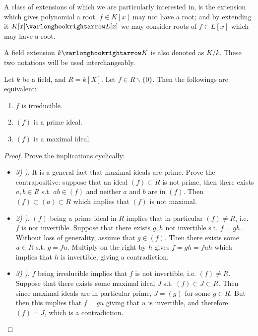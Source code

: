 \documentclass{article}
\begin{document}
\textstart
A class of extensions of which we are particularly interested in, is the extension which gives polynomial a root. $f \in K[x]$ may not have a root; and by extending it $K[x] \ext L[x]$ we may consider roots of $f \in L[x]$ which may have a root.

\begin{notation}
    A field extension $k \ext K$ is also denoted as $K/k$. These two notations will be used interchangeably.
\end{notation}

\begin{proposition}
    Let $k$ be a field, and $R = k[X]$. Let $f \in R \smallsetminus \{0\}$. Then the followings are equivalent:
    \begin{enumerate}[label=\arabic*)]
        \item $f$ is irreducible.
        \item $(f)$ is a prime ideal.
        \item $(f)$ is a maximal ideal.
    \end{enumerate}
\end{proposition}

\begin{proof}
    Prove the implications cyclically:
    \begin{itemize}
        \item \emph{3) ).} It is a general fact that maximal ideals are prime. Prove the contrapositive: suppose that an ideal $(f) \subset R$ is not prime, then there exists $a, b \in R$ s.t. $ab \in (f)$ and neither $a$ and $b$ are in $(f)$. Then $(f) \subset (a) \subset R$ which implies that $(f)$ is not maximal.
        \item \emph{2) ).} $(f)$ being a prime ideal in $R$ implies that in particular $(f) \neq R$, i.e. $f$ is not invertible. Suppose that there exists $g, h$ not invertible s.t. $f = gh$. Without loss of generality, assume that $g \in (f)$. Then there exists some $u \in R$ s.t. $g = fu$. Multiply on the right by $h$ gives $f = gh = fuh$ which implies that $h$ is invertible, giving a contradiction.
        \item \emph{3) ).} $f$ being irreducible implies that $f$ is not invertible, i.e. $(f) \neq R$. Suppose that there exists some maximal ideal $J$ s.t. $(f) \subset J \subset R$. Then since maximal ideals are in particular prime, $J = (g)$ for some $g \in R$. But then this implies that $f = gu$ giving that $u$ is invertible, and therefore $(f) = J$, which is a contradiction.
    \end{itemize}
\end{proof}
\end{document}
